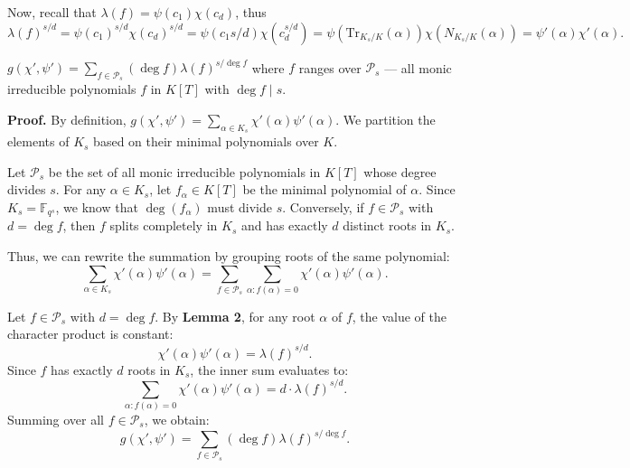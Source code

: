\documentclass{template}
\begin{document}
Now, recall that $\lambda(f) = \psi(c_1)\chi(c_d)$, thus
\begin{equation*}
    \lambda(f)^{s/d} = \psi(c_1)^{s/d}\chi(c_d)^{s/d} = \psi(c_1s/d)\chi(c_d^{s/d}) = \psi(\text{Tr}_{K_s/K}(\alpha))\chi(N_{K_s/K}(\alpha)) = \psi'(\alpha)\chi'(\alpha).
\end{equation*}

\begin{lemma}
    $g(\chi', \psi') = \sum_{f \in \mathcal{P}_s} (\deg f)\lambda(f)^{s/\deg f}$ where $f$ ranges
    over $\mathcal{P}_s$  --- all monic irreducible polynomials $f$ in $K[T]$ with $\deg f \mid s$.
\end{lemma}

\textbf{Proof.} By definition, $g(\chi', \psi') = \sum_{\alpha \in K_s} \chi'(\alpha)\psi'(\alpha)$. We partition the elements of $K_s$ based on their minimal polynomials over $K$.

Let $\mathcal{P}_s$ be the set of all monic irreducible polynomials in $K[T]$ whose degree divides $s$. For any $\alpha \in K_s$, let $f_\alpha \in K[T]$ be the minimal polynomial of $\alpha$. Since $K_s = \mathbb{F}_{q^s}$, we know that $\deg(f_\alpha)$ must divide $s$. Conversely, if $f \in \mathcal{P}_s$ with $d = \deg f$, then $f$ splits completely in $K_s$ and has exactly $d$ distinct roots in $K_s$.

Thus, we can rewrite the summation by grouping roots of the same polynomial:
\begin{equation*}
    \sum_{\alpha \in K_s} \chi'(\alpha)\psi'(\alpha) = \sum_{f \in \mathcal{P}_s} \sum_{\alpha: f(\alpha)=0} \chi'(\alpha)\psi'(\alpha).
\end{equation*}

Let $f \in \mathcal{P}_s$ with $d = \deg f$. By \textbf{Lemma 2}, for any root $\alpha$ of $f$, the value of the character product is constant:
\begin{equation*}
    \chi'(\alpha)\psi'(\alpha) = \lambda(f)^{s/d}.
\end{equation*}
Since $f$ has exactly $d$ roots in $K_s$, the inner sum evaluates to:
\begin{equation*}
    \sum_{\alpha: f(\alpha)=0} \chi'(\alpha)\psi'(\alpha) = d \cdot \lambda(f)^{s/d}.
\end{equation*}
Summing over all $f \in \mathcal{P}_s$, we obtain:
\begin{equation*}
    g(\chi', \psi') = \sum_{f \in \mathcal{P}_s} (\deg f)\lambda(f)^{s/\deg f}.
\end{equation*}
\end{document}
